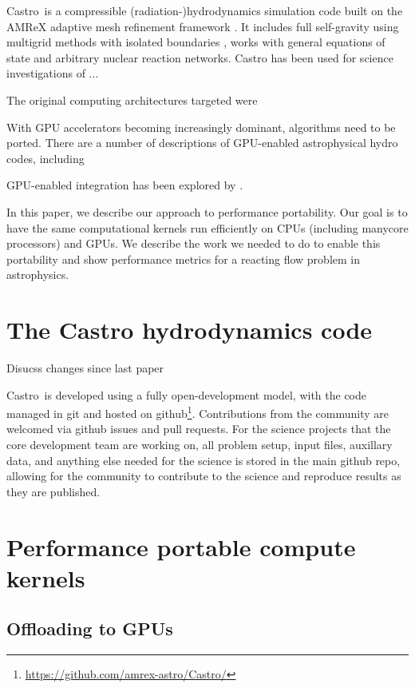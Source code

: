 \documentclass[twocolumn,times]{aastex62}
\newcommand{\castro}{{\sf Castro}}
\begin{document}
\castro\ is a compressible (radiation-)hydrodynamics simulation code built on
the AMReX adaptive mesh refinement framework \citep{castro,castro2,castro3}.  It 
includes full self-gravity using multigrid methods with isolated boundaries
\citep{katz:2016}, works with general equations of state \citep{zingalekatz}
and arbitrary nuclear reaction networks.  Castro has been used for science investigations of
...

The original computing architectures targeted were

With GPU accelerators becoming increasingly dominant, algorithms need to be ported.
There are a number of descriptions of GPU-enabled astrophysical hydro codes, including
\citet{gamer,cholla,fargo3d,pekkila:2017,caplan:2018,racz:2018,liska:2018,goz:2018}

GPU-enabled integration has been explored by \citep{brock:2015}.


In this paper, we describe our approach to performance portability.
Our goal is to have the same computational kernels run efficiently on
CPUs (including manycore processors) and GPUs.  We describe the work
we needed to do to enable this portability and show performance
metrics for a reacting flow problem in astrophysics.


\section{The Castro hydrodynamics code}

Disucss changes since last paper

\castro\ is developed using a fully open-development model, with the
code managed in git and hosted on
github\footnote{\url{https://github.com/amrex-astro/Castro/}}.
Contributions from the community are welcomed via github issues and
pull requests.  For the science projects that the core development
team are working on, all problem setup, input files, auxillary data,
and anything else needed for the science is stored in the main github
repo, allowing for the community to contribute to the science and
reproduce results as they are published.

\section{Performance portable compute kernels}


\subsection{Offloading to GPUs}
\end{document}
